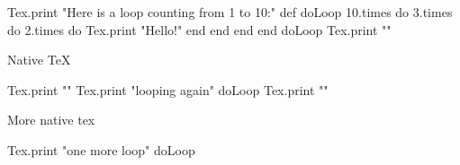 \documentclass{article}
\begin{document}
\begin{rbtex}
Tex.print "Here is a loop counting from 1 to 10:"
def doLoop
    10.times do
        3.times do
            2.times do
                Tex.print "Hello!"
            end
        end
    end
end
doLoop
Tex.print ""
\end{rbtex}
Native TeX\\
\begin{rbtex}
Tex.print ""
Tex.print "looping again"
doLoop
Tex.print ""
\end{rbtex}
More native tex\\


\begin{rbtex}
Tex.print "one more loop"
doLoop
\end{rbtex}
\end{document}
